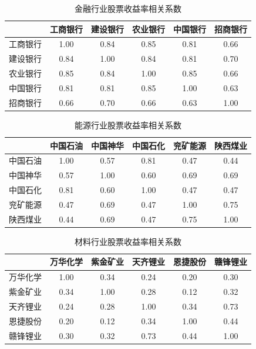 \documentclass[a4paper,12pt]{article}
\begin{document}
\begin{table}[H]
\centering
\caption{金融行业股票收益率相关系数}
\begin{tabular}{lccccc}
\toprule
 & 工商银行 & 建设银行 & 农业银行 & 中国银行 & 招商银行 \\
\midrule
工商银行 & 1.00 & 0.84 & 0.85 & 0.81 & 0.66 \\
建设银行 & 0.84 & 1.00 & 0.84 & 0.81 & 0.70 \\
农业银行 & 0.85 & 0.84 & 1.00 & 0.85 & 0.66 \\
中国银行 & 0.81 & 0.81 & 0.85 & 1.00 & 0.63 \\
招商银行 & 0.66 & 0.70 & 0.66 & 0.63 & 1.00 \\
\bottomrule
\end{tabular}
\end{table}

\begin{table}[H]
\centering
\caption{能源行业股票收益率相关系数}
\begin{tabular}{lccccc}
\toprule
 & 中国石油 & 中国神华 & 中国石化 & 兖矿能源 & 陕西煤业 \\
\midrule
中国石油 & 1.00 & 0.57 & 0.81 & 0.47 & 0.44 \\
中国神华 & 0.57 & 1.00 & 0.60 & 0.69 & 0.69 \\
中国石化 & 0.81 & 0.60 & 1.00 & 0.47 & 0.47 \\
兖矿能源 & 0.47 & 0.69 & 0.47 & 1.00 & 0.75 \\
陕西煤业 & 0.44 & 0.69 & 0.47 & 0.75 & 1.00 \\
\bottomrule
\end{tabular}
\end{table}

\begin{table}[H]
\centering
\caption{材料行业股票收益率相关系数}
\begin{tabular}{lccccc}
\toprule
 & 万华化学 & 紫金矿业 & 天齐锂业 & 恩捷股份 & 赣锋锂业 \\
\midrule
万华化学 & 1.00 & 0.34 & 0.24 & 0.20 & 0.30 \\
紫金矿业 & 0.34 & 1.00 & 0.28 & 0.12 & 0.32 \\
天齐锂业 & 0.24 & 0.28 & 1.00 & 0.34 & 0.73 \\
恩捷股份 & 0.20 & 0.12 & 0.34 & 1.00 & 0.44 \\
赣锋锂业 & 0.30 & 0.32 & 0.73 & 0.44 & 1.00 \\
\bottomrule
\end{tabular}
\end{table}
\end{document}
